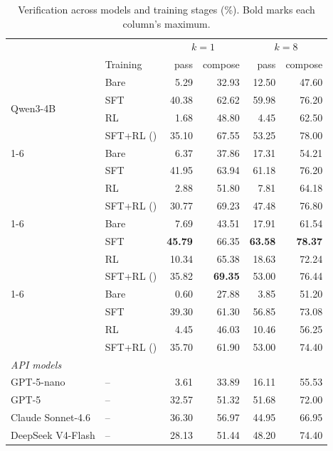 \begin{table}[!t]
\centering
\small
\begin{tabular}{llrrrr}
\toprule
\rowcolor{algobg}
& & \multicolumn{2}{c}{\(k=1\)} & \multicolumn{2}{c}{\(k=8\)} \\
\headercmidrules{\cmidrule(lr){3-4}\cmidrule(lr){5-6}}
\rowcolor{algobg}
\multirow{-2}{*}{Backbone} & \multirow{-2}{*}{Training} & pass & compose & pass & compose \\
\midrule
\multirow{4}{*}{Qwen3-4B}
 & Bare & 5.29 & 32.93 & 12.50 & 47.60 \\
 & SFT & 40.38 & 62.62 & 59.98 & 76.20 \\
 & RL & 1.68 & 48.80 & 4.45 & 62.50 \\
 & SFT+RL (\sam{}) & 35.10 & 67.55 & 53.25 & 78.00 \\
\cmidrule(lr){1-6}
\multirow{4}{*}{Qwen3-8B}
 & Bare & 6.37 & 37.86 & 17.31 & 54.21 \\
 & SFT & 41.95 & 63.94 & 61.18 & 76.20 \\
 & RL & 2.88 & 51.80 & 7.81 & 64.18 \\
 & SFT+RL (\sam{}) & 30.77 & 69.23 & 47.48 & 76.80 \\
\cmidrule(lr){1-6}
\multirow{4}{*}{Qwen3-14B}
 & Bare & 7.69 & 43.51 & 17.91 & 61.54 \\
 & SFT & \textbf{45.79} & 66.35 & \textbf{63.58} & \textbf{78.37} \\
 & RL & 10.34 & 65.38 & 18.63 & 72.24 \\
 & SFT+RL (\sam{}) & 35.82 & \textbf{69.35} & 53.00 & 76.44 \\
\cmidrule(lr){1-6}
\multirow{4}{*}{Llama 3.1-8B}
 & Bare & 0.60 & 27.88 & 3.85 & 51.20 \\
 & SFT & 39.30 & 61.30 & 56.85 & 73.08 \\
 & RL & 4.45 & 46.03 & 10.46 & 56.25 \\
 & SFT+RL (\sam{}) & 35.70 & 61.90 & 53.00 & 74.40 \\
\midrule
\multicolumn{6}{l}{\textit{API models}} \\
GPT-5-nano & -- & 3.61 & 33.89 & 16.11 & 55.53 \\
GPT-5 & -- & 32.57 & 51.32 & 51.68 & 72.00 \\
Claude Sonnet-4.6 & -- & 36.30 & 56.97 & 44.95 & 66.95 \\
DeepSeek V4-Flash & -- & 28.13 & 51.44 & 48.20 & 74.40 \\
\bottomrule
\end{tabular}
\caption{Verification across models and training stages (\%). Bold marks each column's maximum.}
\label{tab:rcf-paired}
\end{table}
